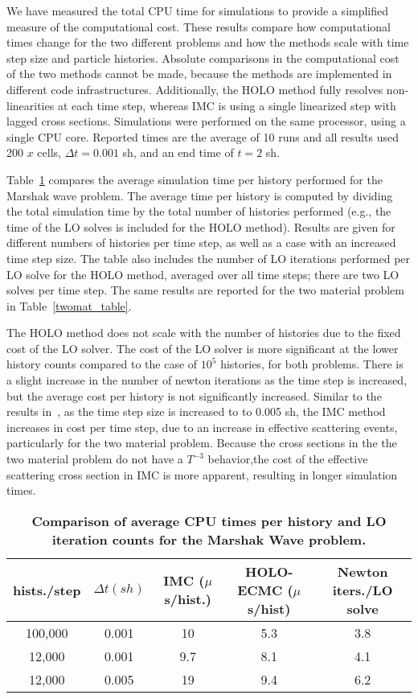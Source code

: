 We have measured the total CPU time for simulations to provide a simplified measure of the
computational cost.  These results compare how computational times change for the two
different problems and how the methods scale with time step size and particle histories.  Absolute comparisons in the computational cost of the two
methods cannot be made, because the methods are implemented
in different code infrastructures. Additionally, the HOLO method fully resolves
non-linearities at each time step, whereas IMC is using a single linearized step with
lagged cross sections. Simulations were performed on the same processor, using a single CPU
core.  Reported times are the average of 10 runs and all results used 200 $x$ cells,
$\Delta t = 0.001$ sh, and an end time of $t=2$ sh.

Table~\ref{marshak_table} compares the average
simulation time per history performed for the Marshak wave problem.  The average time per history is computed by dividing the total simulation time by
the total number of histories performed (e.g., the time of the LO solves is included for
the HOLO method).  Results are given for different numbers of histories per time step, as
well as a case with an increased time step size.  The table also includes the number of LO
iterations performed per LO solve for the HOLO method, averaged over all time steps;
there are two LO solves per time step.  The same results are reported for the two
material problem in Table~\ref{twomat_table}.

The HOLO method does not scale with the number of
histories due to the fixed cost of the LO solver.  The cost of the LO solver is more
significant at the lower history counts compared to the case of $10^5$
histories, for both problems. 
There is a slight increase in the number of
newton iterations as the time step is increased, but the average cost per history is
not significantly increased.   Similar to the results
in~\cite{park}, as the time step size is increased to to 0.005 sh, the IMC method
increases in cost per time step, due to an increase in effective scattering events, particularly for the two material problem. Because
the cross sections in the the two material problem do not have a $T^{-3}$
behavior,the cost of the effective scattering cross section in IMC is more apparent,
resulting in longer simulation times. 
\begin{table}[H]
\centering
\caption{\label{marshak_table} \textbf{Comparison of average CPU times per history
    and LO iteration counts for the Marshak Wave problem. }}
\vspace{-0.1in}
	\begin{tabular}{|cc|c|cc|}\hline
hists./step & $\Delta t (sh)$ & IMC ($\mu$s/hist.) & HOLO-ECMC ($\mu$s/hist) & Newton
iters./LO solve \\ \hline
100,000                    &   0.001	& 10  &  5.3   & 3.8               \\
12,000           &   0.001	& 9.7 &	 8.1   & 4.1               \\
12,000          &   0.005	& 19  &  9.4   & 6.2                \\ \hline
\end{tabular}
\end{table}

